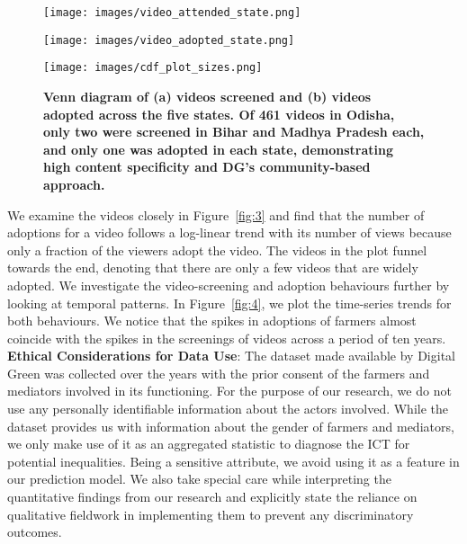 \documentclass[manuscript,screen]{acmart}
\begin{document}
\begin{figure}[tp!]
\centering
\begin{minipage}{.49\textwidth}
  \begin{minipage}{0.49\linewidth}
        \centering
        \texttt{[image: images/video\_attended\_state.png]}
        \label{fig:1a}
    \end{minipage} \hfill
    \begin{minipage}{0.49\linewidth}
        \centering
        \texttt{[image: images/video\_adopted\_state.png]}
        \label{fig:1b}
    \end{minipage}
    \caption{
    \textbf{Venn diagram of (a) videos screened and (b) videos adopted across the five states. Of 461 videos in Odisha, only two were screened in Bihar and Madhya Pradesh each, and only one was adopted in each state, demonstrating high content specificity and DG’s community-based approach.}}
  \label{fig:1}
\end{minipage}
\hfill
\begin{minipage}{.45\textwidth}
  \centering
  \texttt{[image: images/cdf\_plot\_sizes.png]}
  \label{fig:2}
\end{minipage}%
\end{figure}



We examine the videos closely in Figure~\ref{fig:3} and find that the number of adoptions for a video follows a log-linear trend with its number of views because only a fraction of the viewers adopt the video. The videos in the plot funnel towards the end, denoting that there are only a few videos that are widely adopted. We investigate the video-screening and adoption behaviours further by looking at temporal patterns. In Figure~\ref{fig:4}, we plot the time-series trends for both behaviours. We notice that the spikes in adoptions of farmers almost coincide with the spikes in the screenings of videos across a period of ten years. \\

\noindent\textbf{Ethical Considerations for Data Use}: The dataset made available by Digital Green was collected over the years with the prior consent of the farmers and mediators involved in its functioning. For the purpose of our research, we do not use any personally identifiable information about the actors involved. While the dataset provides us with information about the gender of farmers and mediators, we only make use of it as an aggregated statistic to diagnose the ICT for potential inequalities. Being a sensitive attribute, we avoid using it as a feature in our prediction model. We also take special care while interpreting the quantitative findings from our research and explicitly state the reliance on qualitative fieldwork in implementing them to prevent any discriminatory outcomes.
\end{document}
